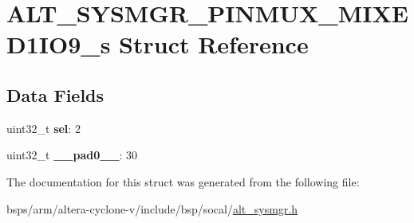 \hypertarget{structALT__SYSMGR__PINMUX__MIXED1IO9__s}{}\section{A\+L\+T\+\_\+\+S\+Y\+S\+M\+G\+R\+\_\+\+P\+I\+N\+M\+U\+X\+\_\+\+M\+I\+X\+E\+D1\+I\+O9\+\_\+s Struct Reference}
\label{structALT__SYSMGR__PINMUX__MIXED1IO9__s}
\subsection*{Data Fields}
\begin{DoxyCompactItemize}
\item 
\mbox{\label{structALT__SYSMGR__PINMUX__MIXED1IO9__s_a1f611553529dfad2bd72b2f5a8af9029}} 
uint32\+\_\+t {\bfseries sel}\+: 2
\item 
\mbox{\label{structALT__SYSMGR__PINMUX__MIXED1IO9__s_a6cf1d47edcd65ca3e876ad3578b47d23}} 
uint32\+\_\+t {\bfseries \+\_\+\+\_\+pad0\+\_\+\+\_\+}\+: 30
\end{DoxyCompactItemize}


The documentation for this struct was generated from the following file\+:\begin{DoxyCompactItemize}
\item 
bsps/arm/altera-\/cyclone-\/v/include/bsp/socal/\mbox{\hyperlink{alt__sysmgr_8h}{alt\+\_\+sysmgr.\+h}}\end{DoxyCompactItemize}
